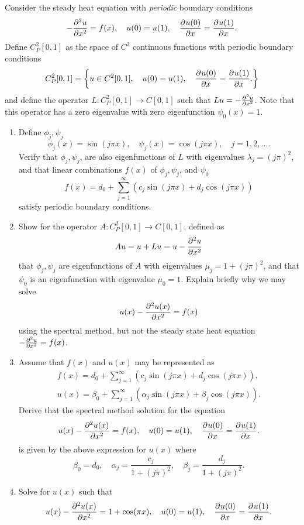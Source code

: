 Consider the steady heat equation with \emph{periodic} boundary conditions
\[
-\frac{\partial^{2} u}{\partial x^{2}} = f(x), \quad u(0) = u(1), \quad \frac{\partial^{} u(0)}{\partial x^{}} = \frac{\partial^{} u(1)}{\partial x^{}}.
\]
Define $C^2_P[0,1]$ as the space of $C^2$ continuous functions with periodic boundary conditions
\[
C^2_P[0,1] = \left\{ 
u\in C^2[0,1], \quad u(0) = u(1), \quad \frac{\partial^{} u(0)}{\partial x^{}} = \frac{\partial^{} u(1)}{\partial x^{}}.
\right\}
\]
and define the operator $L:C^2_P[0,1]\rightarrow C[0,1]$ such that $Lu = -\frac{\partial^{2} u}{\partial x^{2}}$. Note that this operator has a zero eigenvalue with zero eigenfunction $\psi_0(x) = 1$. 

\begin{enumerate}
\item Define $\phi_j, \psi_j$ 
\[
\phi_j(x) = \sin(j\pi x), \quad \psi_j(x) = \cos(j\pi x), \quad j = 1,2,\ldots.
\]
Verify that $\phi_j,\psi_j$, are also eigenfunctions of $L$ with eigenvalues $\lambda_j = (j\pi)^2$, and that linear combinations $f(x)$ of $\phi_j,\psi_j$, and $\psi_0$
\[
f(x) = d_0 + \sum_{j = 1}^\infty \left( c_j \sin(j\pi x) + d_j \cos(j\pi x)\right)
\]
satisfy periodic boundary conditions.
\item Show for the operator $A:C^2_P[0,1]\rightarrow C[0,1]$, defined as
\[
Au = u + Lu = u - \frac{\partial^{2} u}{\partial x^{2}}
\]
that $\phi_j, \psi_j$ are eigenfunctions of $A$ with eigenvalues $\mu_j = 1 + (j\pi)^2$, and that $\psi_0$ is an eigenfunction with eigenvalue $\mu_0 = 1$.  Explain briefly why we may solve 
\[
u(x) - \frac{\partial^{2} u(x)}{\partial x^{2}} = f(x)
\]
using the spectral method, but not the steady state heat equation $-\frac{\partial^{2} u}{\partial x^{2}} = f(x)$.
\item Assume that $f(x)$ and $u(x)$ may be represented as
\begin{align*}
f(x) = d_0 + \sum_{j = 1}^\infty \left( c_j \sin(j\pi x) + d_j \cos(j\pi x)\right),\\
u(x) = \beta_0 + \sum_{j=1}^\infty \left( \alpha_j \sin(j\pi x) + \beta_j \cos(j\pi x) \right).
\end{align*}
Derive that the spectral method solution for the equation
\[
u(x) - \frac{\partial^{2} u(x)}{\partial x^{2}} = f(x), \quad u(0) = u(1), \quad \frac{\partial^{} u(0)}{\partial x^{}} = \frac{\partial^{} u(1)}{\partial x^{}}.
\]
is given by the above expression for $u(x)$ where
\[
\beta_0 = d_0, \quad \alpha_j = \frac{c_j}{1+(j\pi)^2}, \quad \beta_j = \frac{d_j}{1+(j\pi)^2}.
\]
\item Solve for $u(x)$ such that
\[
u(x) - \frac{\partial^{2} u(x)}{\partial x^{2}} = 1 + \cos(\pi x), \quad u(0) = u(1), \quad \frac{\partial^{} u(0)}{\partial x^{}} = \frac{\partial^{} u(1)}{\partial x^{}}.
\]
\end{enumerate}